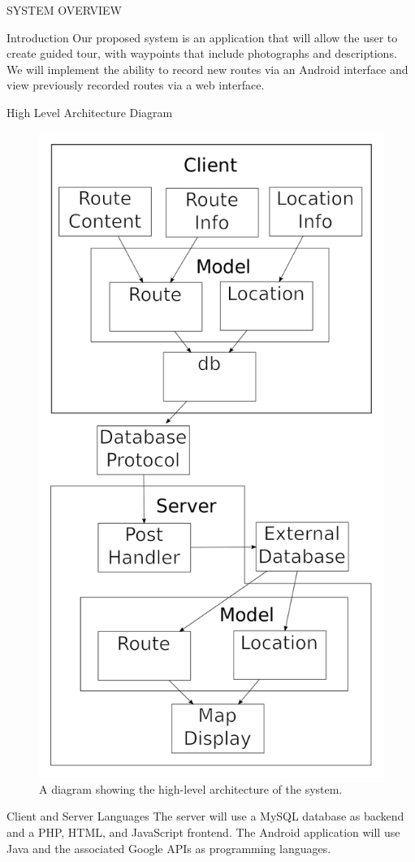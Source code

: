 \documentclass{article}
\begin{document}
	\newpage
	\begin{section}{SYSTEM OVERVIEW}
		\begin{subsection}{Introduction}
			Our proposed system is an application that will allow the user to create guided tour, with waypoints that include photographs and descriptions. We will implement the ability to record new routes via an Android interface and view previously recorded routes via a web interface.
		\end{subsection}
		
		
		\begin{subsection}{High Level Architecture Diagram}
			\begin{figure}[h!]
				\begin{center}
					\includegraphics[height=\columnwidth]{./Diagrams/HighLevelArchitecture/HighLevelArchitecture.png}
				\end{center}
				\caption{A diagram showing the high-level architecture of the system.}
			\end{figure}
		\end{subsection}
				
		\clearpage
		\begin{subsection}{Client and Server Languages}
			The server will use a MySQL database as backend and a PHP, HTML, and JavaScript frontend. The Android application will use Java and the associated Google APIs as programming languages.
		\end{subsection}
	\end{section}
	
\end{document}
